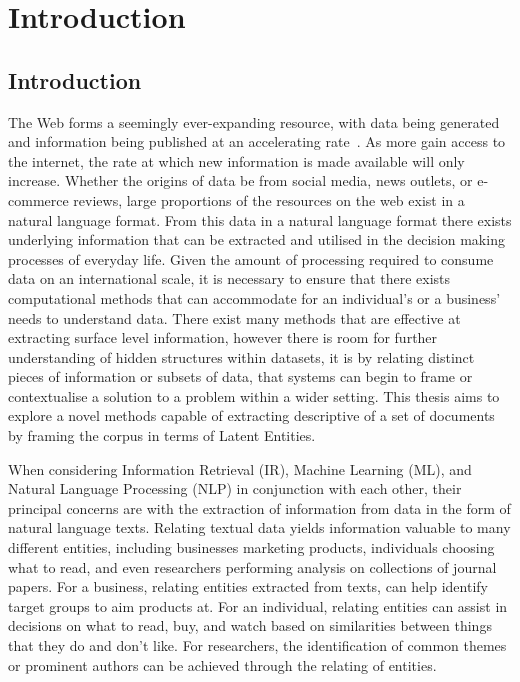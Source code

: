 \documentclass[10pt]{report}
\begin{document}
\renewcommand{\baselinestretch}{1.0}\normalsize


\renewcommand{\baselinestretch}{0.5}\normalsize
\tableofcontents

\listoffigures{}


\listoftables{}

\renewcommand{\baselinestretch}{2.0}\normalsize

%
%
%
%

\chapter{Introduction}

\section{Introduction}
The Web forms a seemingly ever-expanding resource, with data being generated and information being published at an accelerating rate~\cite{WebServer-lc}. As more gain access to the internet, the rate at which new information is made available will only increase. Whether the origins of data be from  social media, news outlets, or e-commerce reviews, large proportions of the resources on the web exist in a natural language format. From this data in a natural language format there exists underlying information that can be extracted and utilised in the decision making processes of everyday life. Given the amount of processing required to consume data on an international scale, it is necessary to ensure that there exists computational methods that can accommodate for an individual's or a business' needs to understand data. There exist many methods that are effective at extracting surface level information, however there is room for further understanding of hidden structures within datasets, it is by relating distinct pieces of information or subsets of data, that systems can begin to frame or contextualise a solution to a problem within a wider setting. This thesis aims to explore a novel methods capable of extracting descriptive of a set of documents by framing the corpus in terms of Latent Entities.

When considering Information Retrieval (IR), Machine Learning (ML), and Natural Language Processing (NLP) in conjunction with each other, their principal concerns are with the extraction of information from data in the form of natural language texts. Relating textual data yields information valuable to many different entities, including businesses marketing products, individuals choosing what to read, and even researchers performing analysis on collections of journal papers. For a business, relating entities extracted from texts, can help identify target groups to aim products at. For an individual, relating entities can assist in decisions on what to read, buy, and watch based on similarities between things that they do and don’t like. For researchers, the identification of common themes or prominent authors can be achieved through the relating of entities.
\end{document}
